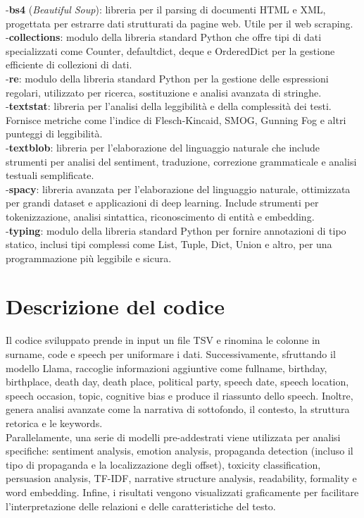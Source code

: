 \documentclass[12pt]{article}
\begin{document}
-\textbf{bs4} (\textit{Beautiful Soup}): libreria per il parsing di documenti HTML e XML, progettata per estrarre dati strutturati da pagine web. Utile per il web scraping. \\
-\textbf{collections}: modulo della libreria standard Python che offre tipi di dati specializzati come Counter, defaultdict, deque e OrderedDict per la gestione efficiente di collezioni di dati. \\
-\textbf{re}: modulo della libreria standard Python per la gestione delle espressioni regolari, utilizzato per ricerca, sostituzione e analisi avanzata di stringhe. \\
-\textbf{textstat}: libreria per l'analisi della leggibilità e della complessità dei testi. Fornisce metriche come l'indice di Flesch-Kincaid, SMOG, Gunning Fog e altri punteggi di leggibilità. \\
\newpage
-\textbf{textblob}: libreria per l'elaborazione del linguaggio naturale che include strumenti per analisi del sentiment, traduzione, correzione grammaticale e analisi testuali semplificate. \\
-\textbf{spacy}: libreria avanzata per l'elaborazione del linguaggio naturale, ottimizzata per grandi dataset e applicazioni di deep learning. Include strumenti per tokenizzazione, analisi sintattica, riconoscimento di entità e embedding. \\
-\textbf{typing}: modulo della libreria standard Python per fornire annotazioni di tipo statico, inclusi tipi complessi come List, Tuple, Dict, Union e altro, per una programmazione più leggibile e sicura.\\

\section{Descrizione del codice}
Il codice sviluppato prende in input un file TSV e rinomina le colonne in surname, code e speech per uniformare i dati. Successivamente, sfruttando il modello Llama, raccoglie informazioni aggiuntive come fullname, birthday, birthplace, death day, death place, political party, speech date, speech location, speech occasion, topic, cognitive bias e produce il riassunto dello speech. Inoltre, genera analisi avanzate come la narrativa di sottofondo, il contesto, la struttura retorica e le keywords.\\
Parallelamente, una serie di modelli pre-addestrati viene utilizzata per analisi specifiche: sentiment analysis, emotion analysis, propaganda detection (incluso il tipo di propaganda e la localizzazione degli offset), toxicity classification, persuasion analysis, TF-IDF, narrative structure analysis, readability, formality e word embedding. Infine, i risultati vengono visualizzati graficamente per facilitare l’interpretazione delle relazioni e delle caratteristiche del testo.
\newpage
\end{document}
